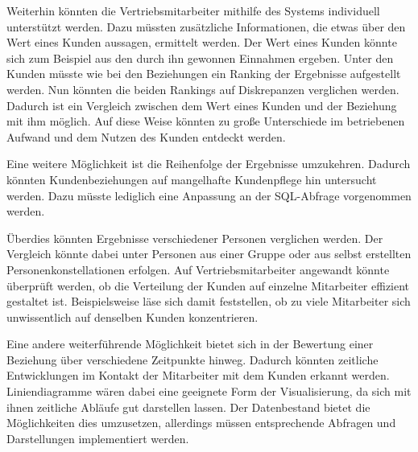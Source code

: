 Weiterhin könnten die Vertriebsmitarbeiter mithilfe des Systems individuell unterstützt werden. Dazu müssten zusätzliche Informationen, die etwas über den Wert eines Kunden aussagen, ermittelt werden. Der Wert eines Kunden könnte sich zum Beispiel aus den durch ihn gewonnen Einnahmen ergeben. Unter den Kunden müsste wie bei den Beziehungen ein Ranking der Ergebnisse aufgestellt werden. Nun könnten die beiden Rankings auf Diskrepanzen verglichen werden. Dadurch ist ein Vergleich zwischen dem Wert eines Kunden und der Beziehung mit ihm möglich. Auf diese Weise könnten zu große Unterschiede im betriebenen Aufwand und dem Nutzen des Kunden entdeckt werden. 

Eine weitere Möglichkeit ist die Reihenfolge der Ergebnisse umzukehren. Dadurch könnten Kundenbeziehungen auf mangelhafte Kundenpflege hin untersucht werden. Dazu müsste lediglich eine Anpassung an der SQL-Abfrage vorgenommen werden.

Überdies könnten Ergebnisse verschiedener Personen verglichen werden. Der Vergleich könnte dabei unter Personen aus einer Gruppe oder aus selbst erstellten Personenkonstellationen erfolgen. Auf Vertriebsmitarbeiter angewandt könnte überprüft werden, ob die Verteilung der Kunden auf einzelne Mitarbeiter effizient gestaltet ist. Beispielsweise läse sich damit feststellen, ob zu viele Mitarbeiter sich unwissentlich auf denselben Kunden konzentrieren.

Eine andere weiterführende Möglichkeit bietet sich in der Bewertung einer Beziehung  über verschiedene Zeitpunkte hinweg. Dadurch könnten zeitliche Entwicklungen im Kontakt der Mitarbeiter mit dem Kunden erkannt werden. Liniendiagramme wären dabei eine geeignete Form der Visualisierung, da sich mit ihnen zeitliche Abläufe gut darstellen lassen. Der Datenbestand bietet die Möglichkeiten dies umzusetzen, allerdings müssen entsprechende Abfragen und Darstellungen implementiert werden.  

